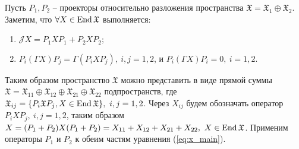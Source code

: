 Пусть $P_1, P_2$ -- проекторы относительно разложения пространства $\mathfrak{X} = \mathfrak{X}_1 \oplus \mathfrak{X}_2$. 
Заметим, что $\forall X \in \operatorname{End}\mathfrak{X}$ выполняется:
\begin{enumerate}
	\item $\mathcal{J}X = P_1 X P_1 + P_2 X P_2;$
	\item $P_i(\Gamma X)P_j = \Gamma(P_i X P_j),\ i,j = 1,2$, и $P_i(\Gamma X)P_i = 0,\ i = 1,2$.
\end{enumerate}
Таким образом пространство $\mathfrak{X}$ можно представить в виде прямой суммы $\mathfrak{X} = \mathfrak{X}_{11} \oplus \mathfrak{X}_{12} \oplus \mathfrak{X}_{21} \oplus \mathfrak{X}_{22}$ подпространств, где $\mathfrak{X}_{ij} = \{ P_i \mathfrak{X} P_j, X \in \operatorname{End}\mathfrak{X} \},\\ \ i,j = 1,2$.
Через $X_{ij}$ будем обозначать оператор $P_i X P_j,\ i,j=1,2$, таким образом $X = (P_1 + P_2)X(P_1 + P_2) = X_{11} + X_{12} + X_{21} + X_{22},\ X \in \operatorname{End}\mathfrak{X}$.
Применим операторы $P_1 \text{ и } P_2$ к обеим частям уравнения (\ref{eq:x_main}).

